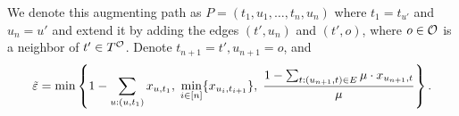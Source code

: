 { %

We denote this augmenting path as $P = (t_1, u_1, \ldots, t_n, u_n)$ where $t_1 = t_{u'}$ and $u_n = u'$ and extend it by adding the edges $(t', u_n)$ and $(t', o)$, where $o \in \mathcal O$ is a neighbor of $t'\in T^\mathcal O$. Denote $t_{n+1} = t', u_{n+1} = o$, and
 \begin{equation*}
     \Tilde{\varepsilon} = \min \left \{ 1 - \sum_{u:(u,t_1)} x_{u, t_1},\; \min_{i \in [n]}\{ x_{u_i, t_{i+1}}\},\; \frac{1- \sum_{t:(u_{n+1},t) \in E} \mu \cdot x_{u_{n+1},t} }{\mu} \right \}.
 \end{equation*}
 
}
